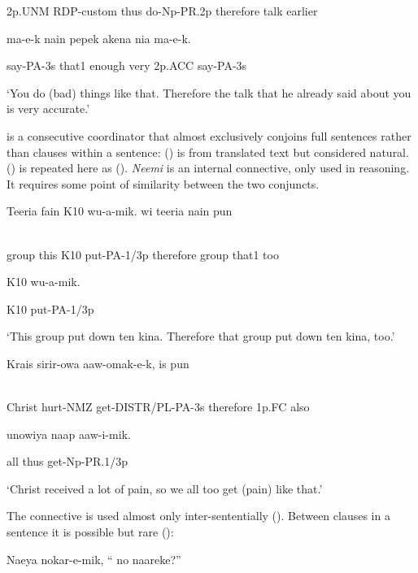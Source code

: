 2p.UNM  RDP-custom  thus  do-Np-PR.2p  therefore  talk  earlier

ma-e-k  nain  pepek  akena  nia  ma-e-k.

say-PA-3s  that1  enough  very  2p.ACC  say-PA-3s

`You do (bad) things like that. Therefore the talk that he already said about you is very accurate.'

  is a consecutive coordinator that almost exclusively conjoins full sentences rather than clauses within a sentence: () is from translated text but considered natural. () is repeated here as (). \textit{Neemi} is an internal connective, only used in reasoning. It requires some point of similarity between the two conjuncts.

\ea%
\label{ex:x1904}
\gll Teeria  fain  K10  wu-a-mik.    wi  teeria  nain  pun  \\
      \\
\glt
\z

group  this  K10  put-PA-1/3p  therefore  group  that1  too

K10  wu-a-mik.

K10  put-PA-1/3p

`This group put down ten kina. Therefore that group put down ten kina, too.'

\ea%
\label{ex:x1409}
\gll Krais  sirir-owa  aaw-omak-e-k,    is  pun \\
      \\
\glt
\z

Christ  hurt-NMZ  get-DISTR/PL-PA-3s  therefore  1p.FC  also

unowiya  naap  aaw-i-mik.

all  thus  get-Np-PR.1/3p

`Christ received a lot of pain, so we all too get (pain) like that.'

The connective  is used almost only inter-sententially (). Between clauses in a sentence it is possible but rare ():

\ea%
\label{ex:x1905}
\gll Naeya  nokar-e-mik,  ``  no  naareke?'' \\
      \\
\glt
\z

